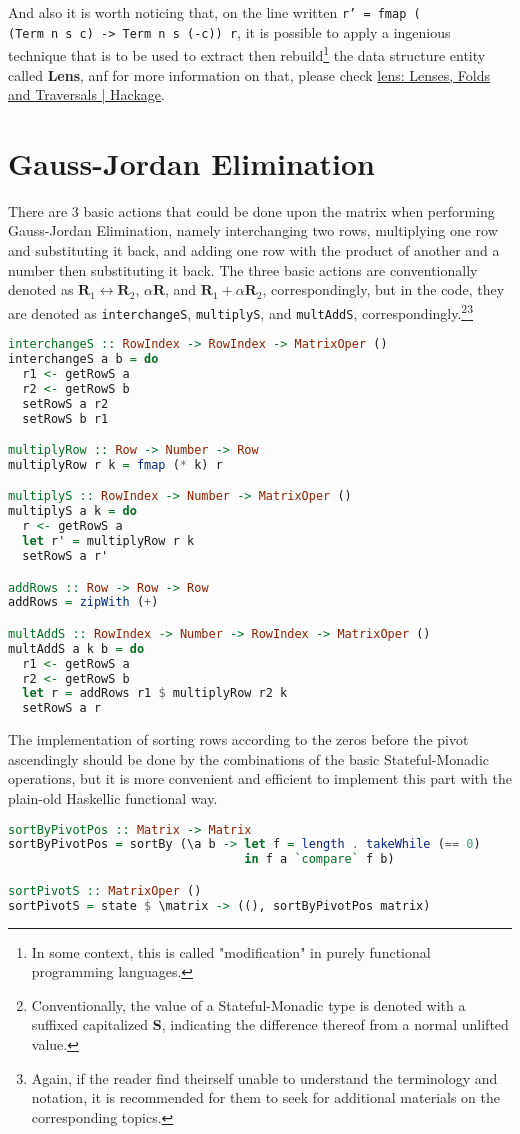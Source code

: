 \documentclass[12pt,a4paper]{article}
\begin{document}
And also it is worth noticing that, on the line written \texttt{r' = fmap (\\(Term n s c) -> Term n s (-c)) r}, it is possible to apply a ingenious technique that is to be used to extract then rebuild\footnote{In some context, this is called "modification" in purely functional programming languages.} the data structure entity called \textbf{Lens}, anf for more information on that, please check \href{https://hackage.haskell.org/package/lens}{lens: Lenses, Folds and Traversals | Hackage}.

\section{Gauss-Jordan Elimination}
There are 3 basic actions that could be done upon the matrix when performing Gauss-Jordan Elimination, namely interchanging two rows, multiplying one row and substituting it back, and adding one row with the product of another and a number then substituting it back. The three basic actions are conventionally denoted as $\mathbf{R}_1 \leftrightarrow \mathbf{R}_2$, $\alpha\mathbf{R}$, and $\mathbf{R}_1 + \alpha\mathbf{R}_2$, correspondingly, but in the code, they are denoted as \texttt{interchangeS}, \texttt{multiplyS}, and \texttt{multAddS}, correspondingly.\footnote{Conventionally, the value of a Stateful-Monadic type is denoted with a suffixed capitalized \textbf{S}, indicating the difference thereof from a normal unlifted value.}\footnote{Again, if the reader find theirself unable to understand the terminology and notation, it is recommended for them to seek for additional materials on the corresponding topics.}
\begin{lstlisting}[language=Haskell]
interchangeS :: RowIndex -> RowIndex -> MatrixOper ()
interchangeS a b = do
  r1 <- getRowS a
  r2 <- getRowS b
  setRowS a r2
  setRowS b r1

multiplyRow :: Row -> Number -> Row
multiplyRow r k = fmap (* k) r

multiplyS :: RowIndex -> Number -> MatrixOper ()
multiplyS a k = do
  r <- getRowS a
  let r' = multiplyRow r k
  setRowS a r'

addRows :: Row -> Row -> Row
addRows = zipWith (+)

multAddS :: RowIndex -> Number -> RowIndex -> MatrixOper ()
multAddS a k b = do
  r1 <- getRowS a
  r2 <- getRowS b
  let r = addRows r1 $ multiplyRow r2 k
  setRowS a r
\end{lstlisting}

The implementation of sorting rows according to the zeros before the pivot ascendingly should be done by the combinations of the basic Stateful-Monadic operations, but it is more convenient and efficient to implement this part with the plain-old Haskellic functional way.
\begin{lstlisting}[language=Haskell]
sortByPivotPos :: Matrix -> Matrix
sortByPivotPos = sortBy (\a b -> let f = length . takeWhile (== 0)
                                 in f a `compare` f b)

sortPivotS :: MatrixOper ()
sortPivotS = state $ \matrix -> ((), sortByPivotPos matrix)
\end{lstlisting}
\end{document}
